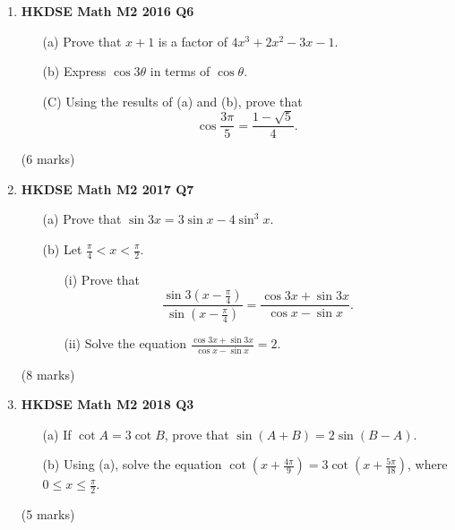 \documentclass{report}
\begin{document}
\begin{enumerate}
	\item \textbf{HKDSE Math M2 2016 Q6}
	\begin{enumerate}
		\item [(a)]Prove that $x+1$ is a factor of $4x^3+2x^2-3x-1$. 
		\item [(b)]Express $\cos{3\theta}$ in terms of $\cos{\theta}$.
		\item [(C)]Using the results of (a) and (b), prove that $$\cos{\displaystyle\frac{3\pi}{5}} = \displaystyle\frac{1-\sqrt{5}}{4}.$$
	\end{enumerate}
	(6 marks)

	\newpage

	\item\textbf{HKDSE Math M2 2017 Q7}
	\begin{enumerate}
		\item[(a)]Prove that $\sin{3x} = 3\sin{x}  - 4\sin^3{x}$. 
		\item[(b)]Let $\displaystyle\frac{\pi}{4} < x < \frac{\pi}{2}$.
		\begin{enumerate}
			\item [(i)]Prove that $$\displaystyle\frac{\sin{3\left(x - \displaystyle\frac{\pi}{4}\right)}}{\sin{\left(x - \displaystyle\frac{\pi}{4}\right)}} = \frac{\cos{3x} + \sin{3x}}{\cos{x} - \sin{x}}.$$
			\item [(ii)]Solve the equation $\displaystyle\frac{\cos{3x} + \sin{3x}}{\cos{x} - \sin{x}} = 2$.
		\end{enumerate}
	\end{enumerate}
	(8 marks)

	\item \textbf{HKDSE Math M2 2018 Q3}
	\begin{enumerate}
		\item [(a)] If $\cot{A} = 3\cot{B}$, prove that $\sin{(A+B)} = 2\sin{(B-A)}$. 
		\item [(b)] Using (a), solve the equation $\displaystyle\cot{(x+\frac{4\pi}{9})} = 3\cot{(x+\frac{5\pi}{18})}$, where $0 \leq x \leq \displaystyle\frac{\pi}{2}$.
	\end{enumerate}
	(5 marks)


\end{enumerate}
\end{document}
